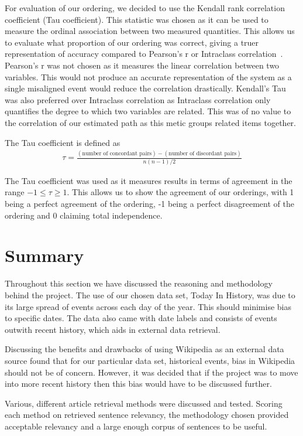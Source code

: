 \documentclass[bsc,frontabs,twoside,singlespacing,parskip,deptreport]{infthesis}     %
\begin{document}
For evaluation of our ordering, we decided to use the Kendall rank correlation coefficient (Tau coefficient).
This statistic was chosen as it can be used to measure the ordinal association between two measured quantities.
This allows us to evaluate what proportion of our ordering was correct, giving a truer representation of accuracy
compared to Pearson's r or Intraclass correlation~\cite{chok2010pearson}.
Pearson's r was not chosen as it measures the linear correlation between two variables.
This would not produce an accurate representation of the system as a single misaligned event would reduce the
correlation drastically.
Kendall's Tau was also preferred over Intraclass correlation as Intraclass correlation only quantifies the
degree to which two variables are related. This was of no value to the correlation of our estimated path
as this metic groups related items together.


The Tau coefficient is defined as
\begin{eqnarray}
  \tau=\frac{(\text{number of concordant pairs})-(\text{number of discordant pairs})}{n(n-1)/2}\nonumber
\end{eqnarray}\cite{abdi2007kendall}

The Tau coefficient was used as it measures results in terms of agreement in the range $-1 \leq \tau \geq 1$.
This allows us to show the agreement of our orderings, with 1 being a perfect agreement of the ordering, -1 being a perfect disagreement of the ordering and 0 claiming
total independence.


\section{Summary}
Throughout this section we have discussed the reasoning and methodology behind the project.
The use of our chosen data set, Today In History, was due to its large spread of events across
each day of the year. This should minimise bias to specific dates. The data also came with date labels and
consists of events outwith recent history, which aids in external data retrieval.

Discussing the benefits and drawbacks of using Wikipedia as an external data source found that
for our particular data set, historical events, bias in Wikipedia should not be of concern.
However, it was decided that if the project was to move into more recent history then this bias would
have to be discussed further.

Various, different article retrieval methods were discussed and tested.
Scoring each method on retrieved sentence relevancy, the methodology chosen provided acceptable relevancy
and a large enough corpus of sentences to be useful.
\end{document}
